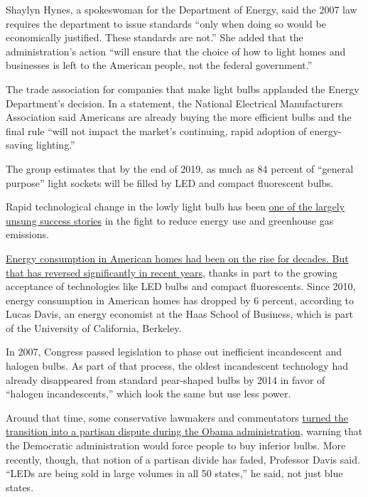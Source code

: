 Shaylyn Hynes, a spokeswoman for the Department of Energy, said the 2007
law requires the department to issue standards ``only when doing so
would be economically justified. These standards are not.'' She added
that the administration's action ``will ensure that the choice of how to
light homes and businesses is left to the American people, not the
federal government.''

The trade association for companies that make light bulbs applauded the
Energy Department's decision. In a statement, the National Electrical
Manufacturers Association said Americans are already buying the more
efficient bulbs and the final rule ``will not impact the market's
continuing, rapid adoption of energy-saving lighting.''

The group estimates that by the end of 2019, as much as 84 percent of
``general purpose'' light sockets will be filled by LED and compact
fluorescent bulbs.

Rapid technological change in the lowly light bulb has been
\href{https://www.nytimes3xbfgragh.onion/interactive/2019/03/08/climate/light-bulb-efficiency.html}{one
of the largely unsung success stories} in the fight to reduce energy use
and greenhouse gas emissions.

\href{https://energyathaas.wordpress.com/2017/05/08/evidence-of-a-decline-in-electricity-use-by-u-s-households/}{Energy
consumption in American homes had been on the rise for
decades}\href{https://energyathaas.wordpress.com/2017/05/08/evidence-of-a-decline-in-electricity-use-by-u-s-households/}{.
But that has reversed significantly in recent years}, thanks in part to
the growing acceptance of technologies like LED bulbs and compact
fluorescents. Since 2010, energy consumption in American homes has
dropped by 6 percent, according to Lucas Davis, an energy economist at
the Haas School of Business, which is part of the University of
California, Berkeley.

In 2007, Congress passed legislation to phase out inefficient
incandescent and halogen bulbs. As part of that process, the oldest
incandescent technology had already disappeared from standard
pear-shaped bulbs by 2014 in favor of ``halogen incandescents,'' which
look the same but use less power.

Around that time, some conservative lawmakers and commentators
\href{https://www.foxnews.com/politics/house-to-consider-bill-nixing-light-bulb-restrictions}{turned
the transition into a partisan dispute during the Obama administration},
warning that the Democratic administration would force people to buy
inferior bulbs. More recently, though, that notion of a partisan divide
has faded, Professor Davis said. ``LEDs are being sold in large volumes
in all 50 states,'' he said, not just blue states.

